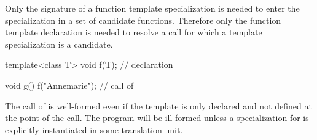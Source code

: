 \pnum
Only the signature of a function template specialization is needed to enter the
specialization in a set of candidate functions.
Therefore only the function template declaration is needed to resolve a call
for which a template specialization is a candidate.
\begin{example}
\begin{codeblock}
template<class T> void f(T);    // declaration

void g() {
  f("Annemarie");               // call of 
}
\end{codeblock}

The call of
is well-formed even if the template
is only declared and not defined at the point of the call.
The program will be ill-formed unless a specialization for
is explicitly instantiated in some translation unit.
\end{example}

